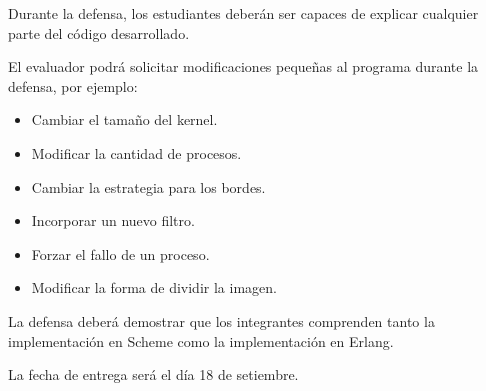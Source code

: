 \documentclass[11pt,a4paper]{article}
\begin{document}
Durante la defensa, los estudiantes deberán ser capaces de explicar
cualquier parte del código desarrollado.

El evaluador podrá solicitar modificaciones pequeñas al programa durante
la defensa, por ejemplo:

\begin{itemize}
\item Cambiar el tamaño del kernel.
\item Modificar la cantidad de procesos.
\item Cambiar la estrategia para los bordes.
\item Incorporar un nuevo filtro.
\item Forzar el fallo de un proceso.
\item Modificar la forma de dividir la imagen.
\end{itemize}

La defensa deberá demostrar que los integrantes comprenden tanto la
implementación en Scheme como la implementación en Erlang.

La fecha de entrega será el día 18 de setiembre.
\end{document}
